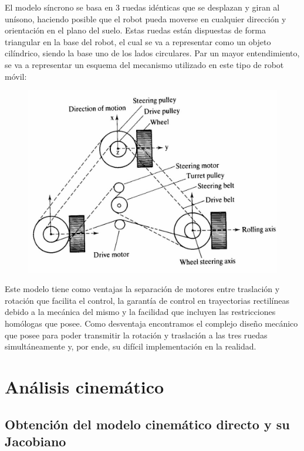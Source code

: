 \documentclass[a4paper,twoside]{article}
\begin{document}
El modelo síncrono se basa en 3 ruedas idénticas que se desplazan y giran al unísono, haciendo posible que el robot pueda moverse en cualquier dirección y orientación en el plano del suelo. Estas ruedas están dispuestas de forma triangular en la base del robot, el cual se va a representar como un objeto cilíndrico, siendo la base uno de los lados circulares. Par un mayor entendimiento, se va a representar un esquema del mecanismo utilizado en este tipo de robot móvil:\\

\begin{figure}[h!]
	\centering
	\includegraphics[width=1\textwidth]{mecanismo_interno}
\end{figure}

Este modelo tiene como ventajas la separación de motores entre traslación y rotación que facilita el control, la garantía de control en trayectorias rectilíneas debido a la mecánica del mismo y la facilidad que incluyen las restricciones homólogas que posee. Como desventaja encontramos el complejo diseño mecánico que posee para poder transmitir la rotación y traslación a las tres ruedas simultáneamente y, por ende, su difícil implementación en la realidad.\\



\section{Análisis cinemático}
	\subsection{Obtención del modelo cinemático directo y su Jacobiano}
	
\end{document}
